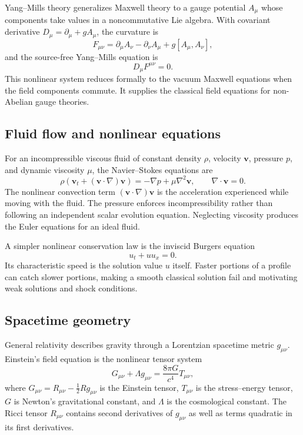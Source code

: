 Yang--Mills theory generalizes Maxwell theory to a gauge potential $A_\mu$ whose components take values in a noncommutative Lie algebra. With covariant derivative $D_\mu=\partial_\mu+gA_\mu$, the curvature is
\begin{equation}
F_{\mu\nu}=\partial_\mu A_\nu-\partial_\nu A_\mu
+g[A_\mu,A_\nu],
\end{equation}
and the source-free Yang--Mills equation is
\begin{equation}
D_\mu F^{\mu\nu}=0.
\end{equation}
This nonlinear system reduces formally to the vacuum Maxwell equations when the field components commute. It supplies the classical field equations for non-Abelian gauge theories.

\subsection{Fluid flow and nonlinear equations}

For an incompressible viscous fluid of constant density $\rho$, velocity $\mathbf{v}$, pressure $p$, and dynamic viscosity $\mu$, the Navier--Stokes equations are
\begin{equation}
\rho\left(\mathbf{v}_t+(\mathbf{v}\cdot\nabla)\mathbf{v}\right)
=-\nabla p+\mu\nabla^2\mathbf{v},
\qquad \nabla\cdot\mathbf{v}=0.
\end{equation}
The nonlinear convection term $(\mathbf{v}\cdot\nabla)\mathbf{v}$ is the acceleration experienced while moving with the fluid. The pressure enforces incompressibility rather than following an independent scalar evolution equation. Neglecting viscosity produces the Euler equations for an ideal fluid.

A simpler nonlinear conservation law is the inviscid Burgers equation
\begin{equation}
u_t+u u_x=0.
\end{equation}
Its characteristic speed is the solution value $u$ itself. Faster portions of a profile can catch slower portions, making a smooth classical solution fail and motivating weak solutions and shock conditions.

\subsection{Spacetime geometry}

General relativity describes gravity through a Lorentzian spacetime metric $g_{\mu\nu}$. Einstein's field equation is the nonlinear tensor system
\begin{equation}
G_{\mu\nu}+\Lambda g_{\mu\nu}
=\frac{8\pi G}{c^4}T_{\mu\nu},
\end{equation}
where $G_{\mu\nu}=R_{\mu\nu}-\tfrac12 Rg_{\mu\nu}$ is the Einstein tensor, $T_{\mu\nu}$ is the stress--energy tensor, $G$ is Newton's gravitational constant, and $\Lambda$ is the cosmological constant. The Ricci tensor $R_{\mu\nu}$ contains second derivatives of $g_{\mu\nu}$ as well as terms quadratic in its first derivatives.

